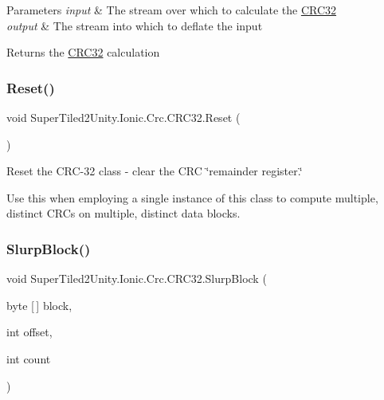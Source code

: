 \begin{DoxyParams}{Parameters}
{\em input} & The stream over which to calculate the \mbox{\hyperlink{class_super_tiled2_unity_1_1_ionic_1_1_crc_1_1_c_r_c32}{C\+R\+C32}}\\
\hline
{\em output} & The stream into which to deflate the input\\
\hline
\end{DoxyParams}
\begin{DoxyReturn}{Returns}
the \mbox{\hyperlink{class_super_tiled2_unity_1_1_ionic_1_1_crc_1_1_c_r_c32}{C\+R\+C32}} calculation
\end{DoxyReturn}
\mbox{\label{class_super_tiled2_unity_1_1_ionic_1_1_crc_1_1_c_r_c32_aacb0cd763cb7bfd3bec2c2aa2d961b19}} 
\subsubsection{\texorpdfstring{Reset()}{Reset()}}
{\footnotesize\ttfamily void Super\+Tiled2\+Unity.\+Ionic.\+Crc.\+C\+R\+C32.\+Reset (\begin{DoxyParamCaption}{ }\end{DoxyParamCaption})}



Reset the C\+R\+C-\/32 class -\/ clear the C\+RC \char`\"{}remainder register.\char`\"{} 

Use this when employing a single instance of this class to compute multiple, distinct C\+R\+Cs on multiple, distinct data blocks. \mbox{\label{class_super_tiled2_unity_1_1_ionic_1_1_crc_1_1_c_r_c32_ad7cbadf67f7afe7d490460a1f9fc2bd4}} 
\subsubsection{\texorpdfstring{Slurp\+Block()}{SlurpBlock()}}
{\footnotesize\ttfamily void Super\+Tiled2\+Unity.\+Ionic.\+Crc.\+C\+R\+C32.\+Slurp\+Block (\begin{DoxyParamCaption}\item[{byte \mbox{[}$\,$\mbox{]}}]{block,  }\item[{int}]{offset,  }\item[{int}]{count }\end{DoxyParamCaption})}



